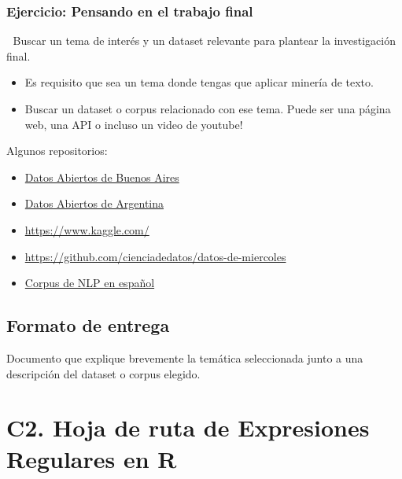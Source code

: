 \documentclass[
  letterpaper,
  DIV=11,
  numbers=noendperiod]{scrreprt}
\providecommand{\tightlist}{%
  \setlength{\itemsep}{0pt}\setlength{\parskip}{0pt}}\usepackage{longtable,booktabs,array}
\begin{document}
\subsection{Ejercicio: Pensando en el trabajo
final}\label{ejercicio-pensando-en-el-trabajo-final}

📌 Buscar un tema de interés y un dataset relevante para plantear la
investigación final.

\begin{itemize}
\item
  Es requisito que sea un tema donde tengas que aplicar minería de
  texto.
\item
  Buscar un dataset o corpus relacionado con ese tema. Puede ser una
  página web, una API o incluso un video de youtube!
\end{itemize}

Algunos repositorios:

\begin{itemize}
\tightlist
\item
  \href{https://data.buenosaires.gob.ar/}{Datos Abiertos de Buenos
  Aires}
\end{itemize}

\begin{itemize}
\tightlist
\item
  \href{https://datos.gob.ar/}{Datos Abiertos de Argentina}
\end{itemize}

\begin{itemize}
\item
  \url{https://www.kaggle.com/}
\item
  \url{https://github.com/cienciadedatos/datos-de-miercoles}
\item
  \href{https://huggingface.co/collections/somosnlp/corpus-instructions-in-spanish-and-related-languages-6697e4ce5ef2828a1ff26d5d}{Corpus
  de NLP en español}
\end{itemize}

\section{Formato de entrega}\label{formato-de-entrega}

Documento que explique brevemente la temática seleccionada junto a una
descripción del dataset o corpus elegido.

\chapter{C2. Hoja de ruta de Expresiones Regulares en
R}\label{c2.-hoja-de-ruta-de-expresiones-regulares-en-r}
\end{document}
